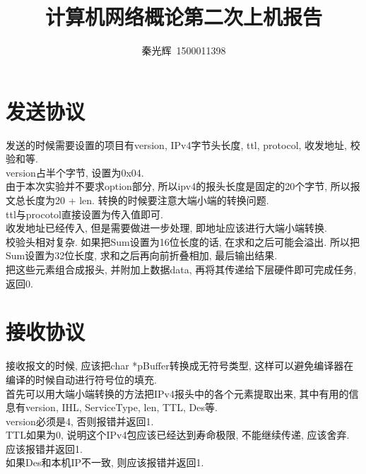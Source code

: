 \documentclass[a4paper,12pt,notitlepage]{article}
\begin{document}
\title{计算机网络概论第二次上机报告}
\author{秦光辉\ 1500011398}
\maketitle

\section{发送协议}

	发送的时候需要设置的项目有version, IPv4字节头长度, ttl, protocol, 收发地址, 校验和等. \\
	
	version占半个字节, 设置为0x04. \\
	
	由于本次实验并不要求option部分, 所以ipv4的报头长度是固定的20个字节, 所以报文总长度为20 + len. 转换的时候要注意大端小端的转换问题. \\
	
	ttl与procotol直接设置为传入值即可. \\
	
	收发地址已经传入, 但是需要做进一步处理, 即地址应该进行大端小端转换. \\

	校验头相对复杂. 如果把Sum设置为16位长度的话, 在求和之后可能会溢出. 所以把Sum设置为32位长度, 求和之后再向前折叠相加, 最后输出结果. \\
	
	把这些元素组合成报头, 并附加上数据data, 再将其传递给下层硬件即可完成任务, 返回0. \\
	
\section{接收协议}

	接收报文的时候, 应该把char *pBuffer转换成无符号类型, 这样可以避免编译器在编译的时候自动进行符号位的填充. \\
	
	首先可以用大端小端转换的方法把IPv4报头中的各个元素提取出来, 其中有用的信息有version, IHL, ServiceType, len, TTL, Des等. \\
	
	version必须是4, 否则报错并返回1. \\
	
	TTL如果为0, 说明这个IPv4包应该已经达到寿命极限, 不能继续传递, 应该舍弃. 应该报错并返回1. \\
	
	如果Des和本机IP不一致, 则应该报错并返回1. \\
	
\end{document}
